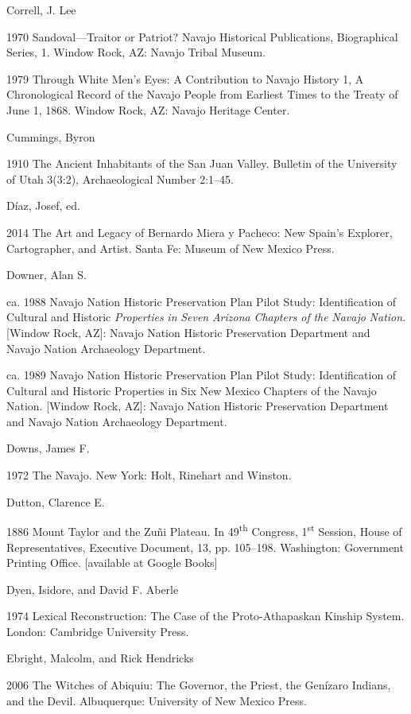 Correll, J. Lee

1970  Sandoval—Traitor or Patriot?  Navajo Historical Publications, Biographical Series, 1.  Window Rock, AZ:  Navajo Tribal Museum.

1979  Through White Men’s Eyes: A Contribution to Navajo History 1, A Chronological Record of the Navajo People from Earliest Times to the Treaty of June 1, 1868.  Window Rock, AZ:  Navajo Heritage Center.

Cummings, Byron

1910  The Ancient Inhabitants of the San Juan Valley.  Bulletin of the University of Utah 3(3:2), Archaeological Number 2:1–45.

Díaz, Josef, ed.

2014  The Art and Legacy of Bernardo Miera y Pacheco: New Spain’s Explorer, Cartographer, and Artist.  Santa Fe:  Museum of New Mexico Press.

Downer, Alan S.

ca. 1988  Navajo Nation Historic Preservation Plan Pilot Study: Identification of Cultural and Historic \textit{Properties} \textit{in} \textit{Seven} \textit{Arizona} \textit{Chapters} \textit{of} \textit{the} \textit{Navajo} \textit{Nation}.  [Window Rock, AZ]:  Navajo Nation Historic Preservation Department and Navajo Nation Archaeology Department.

ca. 1989  Navajo Nation Historic Preservation Plan Pilot Study: Identification of Cultural and Historic Properties in Six New Mexico Chapters of the Navajo Nation.  [Window Rock, AZ]:  Navajo Nation Historic Preservation Department and Navajo Nation Archaeology Department.

Downs, James F.  

1972  The Navajo.  New York:  Holt, Rinehart and Winston.

Dutton, Clarence E.

1886  Mount Taylor and the Zuñi Plateau.  In 49\textsuperscript{th} Congress, 1\textsuperscript{st} Session, House of Representatives, Executive Document, 13, pp. 105–198.  Washington:  Government Printing Office.  [available at Google Books]

Dyen, Isidore, and David F. Aberle  

1974  Lexical Reconstruction: The Case of the Proto-Athapaskan Kinship System.  London:  Cambridge University Press.

Ebright, Malcolm, and Rick Hendricks

2006  The Witches of Abiquiu: The Governor, the Priest, the Genízaro Indians, and the Devil.  Albuquerque:  University of New Mexico Press.

